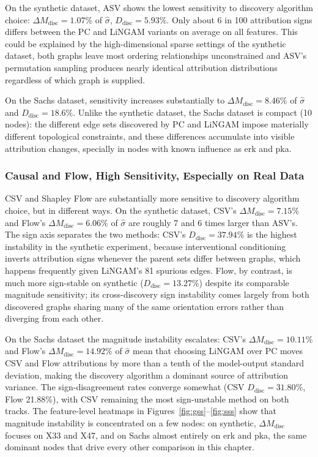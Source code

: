 \documentclass[12pt,a4paper,oneside]{article}
\begin{document}
On the synthetic dataset, ASV shows the lowest sensitivity to discovery algorithm choice: $\Delta M_{\text{disc}} = 1.07\%$ of $\hat{\sigma}$, $D_{\text{disc}} = 5.93\%$. Only about 6 in 100 attribution signs differs between the PC and LiNGAM variants on average on all features. This could be explained by the high-dimensional sparse settings of the synthetic dataset, both graphs leave most ordering relationships unconstrained and ASV's permutation sampling produces nearly identical attribution distributions regardless of which graph is supplied.

On the Sachs dataset, sensitivity increases substantially to $\Delta M_{\text{disc}} = 8.46\%$ of $\hat{\sigma}$ and $D_{\text{disc}} = 18.6\%$. Unlike the synthetic dataset, the Sachs dataset is compact (10 nodes): the different edge sets discovered by PC and LiNGAM impose materially different topological constraints, and these differences accumulate into visible attribution changes, specially in nodes with known influence as erk and pka.

\subsubsection{Causal and Flow, High Sensitivity, Especially on Real Data}

CSV and Shapley Flow are substantially more sensitive to discovery algorithm choice, but in different ways. On the synthetic dataset, CSV's $\Delta M_{\text{disc}} = 7.15\%$ and Flow's $\Delta M_{\text{disc}} = 6.06\%$ of $\hat{\sigma}$ are roughly 7 and 6 times larger than ASV's. The sign axis separates the two methods: CSV's $D_{\text{disc}} = 37.94\%$ is the highest instability in the synthetic experiment, because interventional conditioning inverts attribution signs whenever the parent sets differ between graphs, which happens frequently given LiNGAM's 81 spurious edges. Flow, by contrast, is much more sign-stable on synthetic ($D_{\text{disc}} = 13.27\%$) despite its comparable magnitude sensitivity; its cross-discovery sign instability comes largely from both discovered graphs sharing many of the same orientation errors rather than diverging from each other.

On the Sachs dataset the magnitude instability escalates: CSV's $\Delta M_{\text{disc}} = 10.11\%$ and Flow's $\Delta M_{\text{disc}} = 14.92\%$ of $\hat{\sigma}$ mean that choosing LiNGAM over PC moves CSV and Flow attributions by more than a tenth of the model-output standard deviation, making the discovery algorithm a dominant source of attribution variance. The sign-disagreement rates converge somewhat (CSV $D_{\text{disc}} = 31.80\%$, Flow 21.88\%), with CSV remaining the most sign-unstable method on both tracks. The feature-level heatmaps in Figures~\ref{fig:gss}--\ref{fig:sss} show that magnitude instability is concentrated on a few nodes: on synthetic, $\Delta M_{\text{disc}}$ focuses on X33 and X47, and on Sachs almost entirely on erk and pka, the same dominant nodes that drive every other comparison in this chapter.
\end{document}
